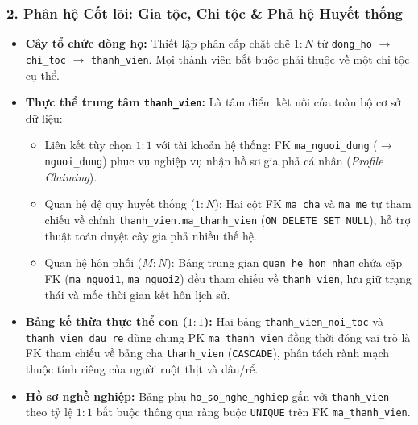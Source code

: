 \subsubsection{2. Phân hệ Cốt lõi: Gia tộc, Chi tộc \& Phả hệ Huyết thống}
\begin{itemize}
    \item \textbf{Cây tổ chức dòng họ:} Thiết lập phân cấp chặt chẽ $1:N$ từ \texttt{dong\_ho} $\to$ \texttt{chi\_toc} $\to$ \texttt{thanh\_vien}. Mọi thành viên bắt buộc phải thuộc về một chi tộc cụ thể.
    \item \textbf{Thực thể trung tâm \texttt{thanh\_vien}:} Là tâm điểm kết nối của toàn bộ cơ sở dữ liệu:
    \begin{itemize}
        \item Liên kết tùy chọn $1:1$ với tài khoản hệ thống: FK \texttt{ma\_nguoi\_dung} ($\to$ \texttt{nguoi\_dung}) phục vụ nghiệp vụ nhận hồ sơ gia phả cá nhân (\textit{Profile Claiming}).
        \item Quan hệ đệ quy huyết thống ($1:N$): Hai cột FK \texttt{ma\_cha} và \texttt{ma\_me} tự tham chiếu về chính \texttt{thanh\_vien.ma\_thanh\_vien} (\texttt{ON DELETE SET NULL}), hỗ trợ thuật toán duyệt cây gia phả nhiều thế hệ.
        \item Quan hệ hôn phối ($M:N$): Bảng trung gian \texttt{quan\_he\_hon\_nhan} chứa cặp FK (\texttt{ma\_nguoi1}, \texttt{ma\_nguoi2}) đều tham chiếu về \texttt{thanh\_vien}, lưu giữ trạng thái và mốc thời gian kết hôn lịch sử.
    \end{itemize}
    \item \textbf{Bảng kế thừa thực thể con ($1:1$):} Hai bảng \texttt{thanh\_vien\_}\allowbreak\texttt{noi\_toc} và \texttt{thanh\_vien\_}\allowbreak\texttt{dau\_re} dùng chung PK \texttt{ma\_thanh\_vien} đồng thời đóng vai trò là FK tham chiếu về bảng cha \texttt{thanh\_vien} (\texttt{CASCADE}), phân tách rành mạch thuộc tính riêng của người ruột thịt và dâu/rể.
    \item \textbf{Hồ sơ nghề nghiệp:} Bảng phụ \texttt{ho\_so\_nghe\_nghiep} gắn với \texttt{thanh\_vien} theo tỷ lệ $1:1$ bắt buộc thông qua ràng buộc \texttt{UNIQUE} trên FK \texttt{ma\_thanh\_vien}.
\end{itemize}

